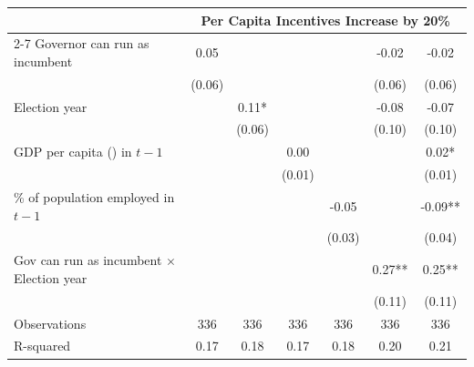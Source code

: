 {
\def\sym#1{\ifmmode^{#1}\else\(^{#1}\)\fi}
\begin{tabular}{l*{6}{c}}
\hline\hline
                    &\multicolumn{6}{c}{Per Capita Incentives Increase by 20\%}                                     \\\cmidrule(lr){2-7}
\hline
Governor can run as incumbent&        0.05   &               &               &               &       -0.02   &       -0.02   \\
                    &      (0.06)   &               &               &               &      (0.06)   &      (0.06)   \\
Election year       &               &        0.11*  &               &               &       -0.08   &       -0.07   \\
                    &               &      (0.06)   &               &               &      (0.10)   &      (0.10)   \\
GDP per capita (\textdollar1000) in $ t-1$&               &               &        0.00   &               &               &        0.02*  \\
                    &               &               &      (0.01)   &               &               &      (0.01)   \\
\% of population employed in $ t-1$&               &               &               &       -0.05   &               &       -0.09** \\
                    &               &               &               &      (0.03)   &               &      (0.04)   \\
Gov can run as incumbent $\times$ Election year&               &               &               &               &        0.27** &        0.25** \\
                    &               &               &               &               &      (0.11)   &      (0.11)   \\
\hline
Observations        &         336   &         336   &         336   &         336   &         336   &         336   \\
R-squared           &        0.17   &        0.18   &        0.17   &        0.18   &        0.20   &        0.21   \\
\hline\hline
\end{tabular}
}
